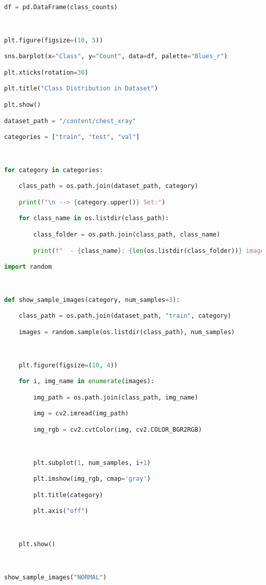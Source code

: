 \documentclass{article}
\begin{document}
\begin{lstlisting}[style=mystyle,language=Python]
df = pd.DataFrame(class_counts)



plt.figure(figsize=(10, 5))

sns.barplot(x="Class", y="Count", data=df, palette="Blues_r")

plt.xticks(rotation=30)

plt.title("Class Distribution in Dataset")

plt.show()

dataset_path = "/content/chest_xray"

categories = ["train", "test", "val"]



for category in categories:

    class_path = os.path.join(dataset_path, category)

    print(f"\n --> {category.upper()} Set:")

    for class_name in os.listdir(class_path):

        class_folder = os.path.join(class_path, class_name)

        print(f"  - {class_name}: {len(os.listdir(class_folder))} images")

import random



def show_sample_images(category, num_samples=3):

    class_path = os.path.join(dataset_path, "train", category)

    images = random.sample(os.listdir(class_path), num_samples)



    plt.figure(figsize=(10, 4))

    for i, img_name in enumerate(images):

        img_path = os.path.join(class_path, img_name)

        img = cv2.imread(img_path)

        img_rgb = cv2.cvtColor(img, cv2.COLOR_BGR2RGB)



        plt.subplot(1, num_samples, i+1)

        plt.imshow(img_rgb, cmap='gray')

        plt.title(category)

        plt.axis("off")



    plt.show()



show_sample_images("NORMAL")


\end{lstlisting}
\end{document}
